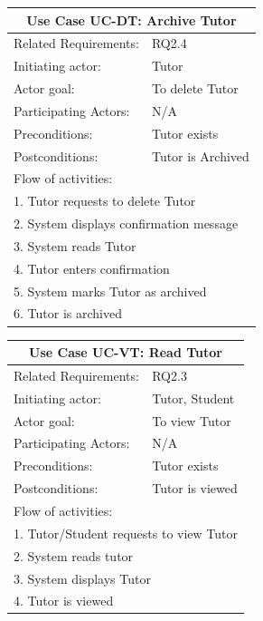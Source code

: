 \documentclass[12pt]{article}
\begin{document}
		\begin{tabular}{| l | p{10cm}| }
			\hline\multicolumn{2}{|c|}{ \textbf{Use Case UC-DT: Archive Tutor}} \\ \hline
			Related Requirements: & RQ2.4\\ \hline
			Initiating actor: & Tutor\\ \hline
			Actor goal: & To delete Tutor\\ \hline
			Participating Actors: & N/A\\ \hline
			Preconditions:& Tutor exists\\ \hline
			Postconditions: & Tutor is Archived\\ \hline
			\multicolumn{2}{|l|}{Flow of activities:}\\ \hline
			\multicolumn{2}{|p{15cm}|}{1. Tutor requests to delete Tutor}\\
			\multicolumn{2}{|p{15cm}|}{2. System displays confirmation message}\\
			\multicolumn{2}{|p{15cm}|}{3. System reads Tutor}\\
			\multicolumn{2}{|p{15cm}|}{4. Tutor enters confirmation}	\\
			\multicolumn{2}{|p{15cm}|}{5. System marks Tutor as archived }\\
			\multicolumn{2}{|l|}{6. Tutor is archived}
			\\ \hline
		\end{tabular}




		\begin{tabular}{| l | p{10cm}| }
			\hline\multicolumn{2}{|c|}{ \textbf{Use Case UC-VT: Read Tutor}} \\ \hline
			Related Requirements: & RQ2.3\\ \hline
			Initiating actor: & Tutor, Student \\ \hline
			Actor goal: & To view Tutor\\ \hline
			Participating Actors: & N/A\\ \hline
			Preconditions:& Tutor exists\\ \hline
			Postconditions: & Tutor is viewed\\ \hline
			\multicolumn{2}{|l|}{Flow of activities:}\\ \hline
			\multicolumn{2}{|p{15cm}|}{1. Tutor/Student requests to view Tutor}\\
			\multicolumn{2}{|p{15cm}|}{2. System reads tutor}\\
			\multicolumn{2}{|p{15cm}|}{3. System displays Tutor}\\
			\multicolumn{2}{|l|}{4. Tutor is viewed}
			\\ \hline
		\end{tabular}
\end{document}
